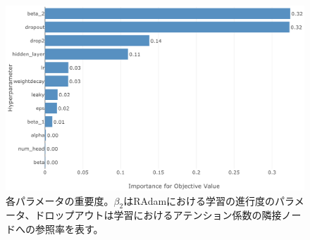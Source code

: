 \begin{figure}[H]
	\begin{center}
 \includegraphics[keepaspectratio, scale=0.3]
 	{Figure/Flavortagging/bayesian3.png}
 		\caption{各パラメータの重要度。$\beta_2$はRAdamにおける学習の進行度のパラメータ、ドロップアウトは学習におけるアテンション係数の隣接ノードへの参照率を表す。}
 		\label{bayes3}
	\end{center}
\end{figure}

